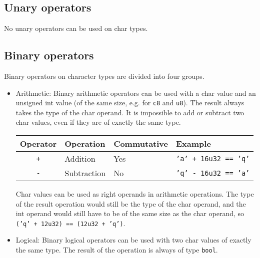 \subsection{Unary operators}
\label{sec:org78546fb}

No unary operators can be used on char types.

\subsection{Binary operators}
\label{sec:orge863f7d}

Binary operators on character types are divided into four groups.

\begin{itemize}
\item Arithmetic: Binary arithmetic operators can be used with a char value and
  an unsigned int value (of the same size, e.g. for \texttt{c8} and
  \texttt{u8}). The result always takes the type of the char operand. It is
  impossible to add or subtract two char values, even if they are of exactly the
  same type.

  \begin{center}
    \vspace{-5pt}\begin{adjustbox}{max width=1.0\linewidth}
      \begin{tabular}{|c|lll|}
        \hline
        Operator & Operation & Commutative & Example\\[0pt]
        \hline
        \hline
        \texttt{+} & Addition & Yes & \texttt{'a' + 16u32 == 'q'}\\[0pt]
        \texttt{-} & Subtraction & No & \texttt{'q' - 16u32 == 'a'}\\[0pt]
        \hline
      \end{tabular}
  \end{adjustbox}\end{center}


  Char values can be used as right operands in arithmetic operations. The type of
  the result operation would still be the type of the char operand, and the int
  operand would still have to be of the same size as the char operand, so
  \texttt{('q' + 12u32) == (12u32 + 'q')}.

\item Logical: Binary logical operators can be used with two char values of
  exactly the same type. The result of the operation is always of type
  \texttt{bool}.


\end{itemize}
